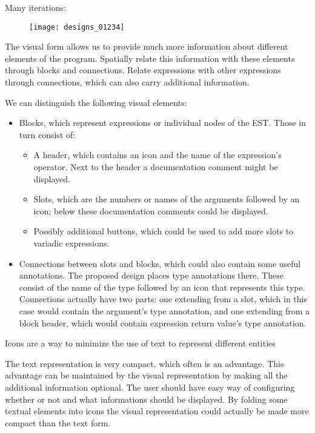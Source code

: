 Many iterations:

\begin{figure}[h!]
\centering \texttt{[image: designs\_01234]}
\caption{}
\label{fig:designs_01234}
\end{figure}

The visual form allows us to provide much more information about different
elements of the program.  Spatially relate this information with these elements
through blocks and connections.  Relate expressions with other expressions
through connections, which can also carry additional information.

We can distinguish the following visual elements:
\begin{itemize}
	\item Blocks, which represent expressions or individual nodes of the
          EST. Those in turn consist of:
	\begin{itemize}
		\item A header, which contains an icon and the name of the
                  expression's operator. Next to the header a documentation
                  comment might be displayed.
		\item Slots, which are the numbers or names of the arguments
                  followed by an icon; below these documentation comments could
                  be displayed.
		\item Possibly additional buttons, which could be used to add
                  more slots to variadic expressions.
	\end{itemize}
	\item Connections between slots and blocks, which could also contain
          some useful annotations. The proposed design places type annotations
          there. These consist of the name of the type followed by an icon that
          represents this type. Connections actually have two parts: one
          extending from a slot, which in this case would contain the argument's
          type annotation, and one extending from a block header, which would
          contain expression return value's type annotation.
\end{itemize}

Icons are a way to minimize the use of text to represent different entities

The text representation is very compact, which often is an advantage. This
advantage can be maintained by the visual representation by making all the
additional information optional. The user should have easy way of configuring
whether or not and what informations should be displayed. By folding some
textual elements into icons the visual representation could actually be made
more compact than the text form.

